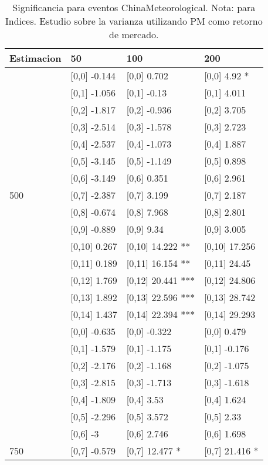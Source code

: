 \begin{table}

\caption{Significancia para eventos ChinaMeteorological. Nota: para Indices. Estudio sobre la varianza utilizando PM como retorno de mercado.}
\centering
\begin{tabular}[t]{llll}
\toprule
Estimacion & 50 & 100 & 200\\
\midrule
 & {}[0,0] -0.144 & {}[0,0] 0.702 & {}[0,0] 4.92 *\\
 & {}[0,1] -1.056 & {}[0,1] -0.13 & {}[0,1] 4.011\\
 & {}[0,2] -1.817 & {}[0,2] -0.936 & {}[0,2] 3.705\\
 & {}[0,3] -2.514 & {}[0,3] -1.578 & {}[0,3] 2.723\\
 & {}[0,4] -2.537 & {}[0,4] -1.073 & {}[0,4] 1.887\\
\addlinespace
 & {}[0,5] -3.145 & {}[0,5] -1.149 & {}[0,5] 0.898\\
 & {}[0,6] -3.149 & {}[0,6] 0.351 & {}[0,6] 2.961\\
500 & {}[0,7] -2.387 & {}[0,7] 3.199 & {}[0,7] 2.187\\
 & {}[0,8] -0.674 & {}[0,8] 7.968 & {}[0,8] 2.801\\
 & {}[0,9] -0.889 & {}[0,9] 9.34 & {}[0,9] 3.005\\
\addlinespace
 & {}[0,10] 0.267 & {}[0,10] 14.222 ** & {}[0,10] 17.256\\
 & {}[0,11] 0.189 & {}[0,11] 16.154 ** & {}[0,11] 24.45\\
 & {}[0,12] 1.769 & {}[0,12] 20.441 *** & {}[0,12] 24.806\\
 & {}[0,13] 1.892 & {}[0,13] 22.596 *** & {}[0,13] 28.742\\
 & {}[0,14] 1.437 & {}[0,14] 22.394 *** & {}[0,14] 29.293\\
\addlinespace
 & {}[0,0] -0.635 & {}[0,0] -0.322 & {}[0,0] 0.479\\
 & {}[0,1] -1.579 & {}[0,1] -1.175 & {}[0,1] -0.176\\
 & {}[0,2] -2.176 & {}[0,2] -1.168 & {}[0,2] -1.075\\
 & {}[0,3] -2.815 & {}[0,3] -1.713 & {}[0,3] -1.618\\
 & {}[0,4] -1.809 & {}[0,4] 3.53 & {}[0,4] 1.624\\
\addlinespace
 & {}[0,5] -2.296 & {}[0,5] 3.572 & {}[0,5] 2.33\\
 & {}[0,6] -3 & {}[0,6] 2.746 & {}[0,6] 1.698\\
750 & {}[0,7] -0.579 & {}[0,7] 12.477 * & {}[0,7] 21.416 *\\

\end{tabular}
\end{table}
